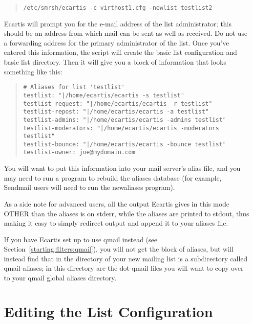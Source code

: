 \documentclass{book}
\begin{document}
\begin{quote}
\footnotesize
\begin{verbatim}
/etc/smrsh/ecartis -c virthost1.cfg -newlist testlist2
\end{verbatim}
\end{quote}
   
Ecartis will prompt you for the e-mail address of the list administrator; this
should be an address from which mail can be sent as well as received. Do not
use a forwarding address for the primary administrator of the list. Once
you've entered this information, the script will create the basic list
configuration and basic list directory. Then it will give you a block of
information that looks something like this:
   
\begin{quote}   
\footnotesize
\begin{verbatim}
# Aliases for list 'testlist'
testlist: "|/home/ecartis/ecartis -s testlist"
testlist-request: "|/home/ecartis/ecartis -r testlist"
testlist-repost: "|/home/ecartis/ecartis -a testlist"
testlist-admins: "|/home/ecartis/ecartis -admins testlist"
testlist-moderators: "|/home/ecartis/ecartis -moderators testlist"
testlist-bounce: "|/home/ecartis/ecartis -bounce testlist"
testlist-owner: joe@mydomain.com
\end{verbatim}
\end{quote}
   
You will want to put this information into your mail server's alias file, and
you may need to run a program to rebuild the aliases database (for example,
Sendmail users will need to run the newaliases program).
   
As a side note for advanced users, all the output Ecartis gives in this mode
OTHER than the aliases is on stderr, while the aliases are printed to stdout,
thus making it easy to simply redirect output and append it to your aliases
file.
   
If you have Ecartis set up to use qmail instead (see
Section~\ref{starting:filters:qmail}), you will not get the block of aliases,
but will instead find that in the directory of your new mailing list is a
subdirectory called qmail-aliases; in this directory are the dot-qmail files
you will want to copy over to your qmail global aliases directory.
   
\section{Editing the List Configuration}
\label{newlist:configure}
   
\end{document}
